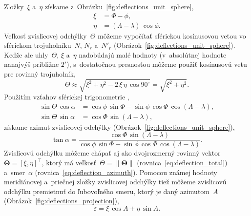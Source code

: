\documentclass[a4paper, 12pt]{book}
\begin{document}
Zložky~$\xi$ a~$\eta$ získame z~Obrázku~\ref{fig:deflections_unit_sphere},
%
\begin{equation}
\begin{split}
\xi  &= \Phi - \phi{,}\\
\eta &= (\Lambda - \lambda) \, \cos\phi{.}
\end{split}
\end{equation}
%
Veľkosť zvislicovej odchýlky~$\Theta$ môžeme vypočítať sférickou kosínusovou 
vetou vo sférickom trojuholníku~$N$, $N_r$ a~$N'_r$ 
(Obrázok~\ref{fig:deflections_unit_sphere}).  Keďže ale uhly~$\Theta$, $\xi$ 
a~$\eta$ nadobúdajú malé hodnoty (v~absolútnej hodnote nanajvýš približne 
$2'$), s~dostatočnou presnosťou môžeme použiť kosínusovú vetu pre rovinný 
trojuholník,
%
\begin{equation}
\label{eq:deflection_total}
\Theta \approx \sqrt{\xi^2 + \eta^2 - 2\, \xi \, \eta \, \cos 90^{\circ}} 
= \sqrt{\xi^2 + \eta^2}{.}
\end{equation}
%
Použitím vzťahov sférickej trigonometrie 
\parencite[napríklad][]{MoritzPhysicalGeodesy},
%
\begin{equation}
\label{eq:deflection_aux}
\begin{split}
\sin\Theta \, \cos\alpha &= \cos\phi \, \sin\Phi - \sin\phi \, \cos\Phi \, 
\cos(\Lambda - \lambda){,}\\
\sin\Theta \, \sin\alpha &= \cos\Phi \, \sin(\Lambda - \lambda),
\end{split}
\end{equation}
%
získame azimut zvislicovej odchýlky 
(Obrázok~\ref{fig:deflections_unit_sphere}),
%
\begin{equation}
\label{eq:deflection_azimuth}
\tan\alpha = \frac{\cos\Phi \, \sin(\Lambda - \lambda)}{\cos\phi \, \sin\Phi 
- \sin\phi \, \cos\Phi \, \cos(\Lambda - \lambda)}{.}
\end{equation}
%
Zvislicovú odchýlku môžeme chápať aj ako dvojrozmerný rovinný 
vektor~$\boldsymbol\Theta = [\xi, \eta]^\top$, ktorý má veľkosť~$\Theta = \| 
\boldsymbol\Theta \|$ (rovnica~\ref{eq:deflection_total}) a~smer~$\alpha$ 
(rovnica~\ref{eq:deflection_azimuth}).  Pomocou známej hodnoty meridiánovej 
a~priečnej zložky zvislicovej odchýlky tiež môžeme zvislicovú odchýlku 
premietnuť do ľubovoľného smeru, ktorý je daný azimutom~$A$ 
(Obrázok~\ref{fig:deflections_projection}),
%
\begin{equation}
\label{eq:deflection_vareps}
\varepsilon = \xi \, \cos A + \eta \, \sin A{.}
\end{equation}
\end{document}
